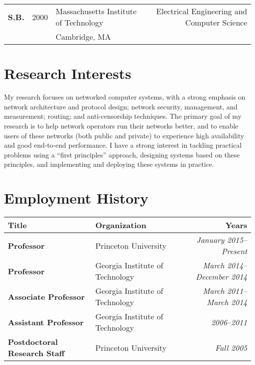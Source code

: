 \documentclass{article}
\begin{document}
\begin{cv}{}
\begin{center}
\begin{tabular}{p{.5in}lp{2.5in}r}
{\bf S.B.} & 2000 & Massachusetts Institute of Technology & Electrical
Engineering and Computer Science \\
& & Cambridge, MA \\
\end{tabular}
\end{center}

\section*{Research Interests}
\label{sec:current}

My research focuses on networked computer systems, with a strong
emphasis on network architecture and protocol design; network security,
management, and measurement; routing; and anti-censorship techniques.
The primary goal of my research is to help network operators run their
networks better, and to enable users of these networks (both public and
private) to experience high availability and good end-to-end
performance.  I have a strong interest in tackling practical problems
using a ``first principles'' approach, designing systems
based on these principles, and implementing and deploying these systems
in practice.  


\section*{Employment History}

\begin{center}
\begin{tabular}{p{2in}p{3in}r}
\textbf{Title} & \textbf{Organization} & \textbf{Years} \\ \hline
{\bf Professor} & Princeton University & {\em
January 2015--Present} \\
{\bf Professor} & Georgia Institute of Technology & {\em
March 2014--December 2014} \\
{\bf Associate Professor} & Georgia Institute of Technology & {\em
March 2011--March 2014} \\

{\bf Assistant Professor} & Georgia Institute of Technology & {\em
2006--2011} \\

{\bf Postdoctoral Research Staff} & Princeton University & {\em Fall 2005} \\


\end{tabular}
\end{center}
\end{cv}
\end{document}
